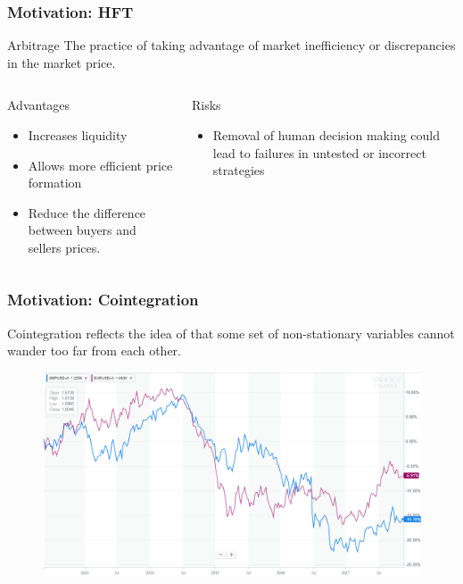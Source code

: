 \documentclass{beamer}
\begin{document}
\begin{frame}
\frametitle{Motivation: HFT}
\begin{alertblock}{Arbitrage}
The practice of taking advantage of market inefficiency or discrepancies in the market price.
\end{alertblock}
\begin{columns}

\begin{column}{0.4\textwidth}
\begin{exampleblock}{Advantages}
\begin{itemize}
\item Increases liquidity
\item Allows more efficient price formation
\item Reduce the difference between buyers and sellers prices.
\end{itemize}
\end{exampleblock}
\end{column}
\begin{column}{0.4\textwidth}
\begin{exampleblock}{Risks}
\begin{itemize}
\item Removal of human decision making could lead to failures in untested or incorrect strategies
\end{itemize}
\end{exampleblock}
\end{column}
\end{columns}
\end{frame}


\begin{frame}
\frametitle{Motivation: Cointegration}
Cointegration reflects the idea of that some set of non-stationary variables cannot wander too far from each other.
\begin{figure}
\includegraphics[width=0.8\paperwidth]{img/motivation}
\end{figure}
\end{frame}
\end{document}
